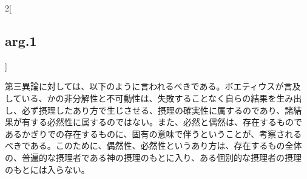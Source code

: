 \documentclass[paper=a4paper,fontsize=10pt,jafontsize=9pt,titlepage]{jlreq}
\begin{document}
\begin{paracol}{2}[\subsection{arg.1}]
\switchcolumn

第三異論に対しては、以下のように言われるべきである。ボエティウスが言及
している、かの非分解性と不可動性は、失敗することなく自らの結果を生み出
し、必ず摂理したあり方で生じさせる、摂理の確実性に属するのであり、諸結
果が有する必然性に属するのではない。また、必然と偶然は、存在するもので
あるかぎりでの存在するものに、固有の意味で伴うということが、考察される
べきである。このために、偶然性、必然性というあり方は、存在するもの全体
の、普遍的な摂理者である神の摂理のもとに入り、ある個別的な摂理者の摂理
のもとには入らない。

\end{paracol}
\newpage
\end{document}
